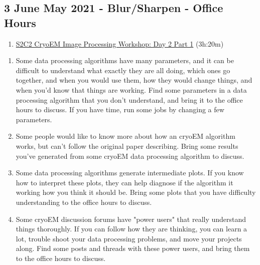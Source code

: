 \documentclass[11pt, oneside]{article}   	%
\begin{document}
\subsection{3 June May 2021 - Blur/Sharpen - Office Hours}
\begin{enumerate}
	\item \href{https://youtu.be/ehXqLnV_Jr4}{S2C2 CryoEM Image Processing Workshop: Day 2 Part 1} (3h:20m)
	\end{enumerate}
\begin{enumerate}
	\item Some data processing algorithms have many parameters, and it can be difficult to understand what exactly they are all doing, which ones go together, and when you would use them, how they would change things, and when you'd know that things are working. Find some parameters in a data processing algorithm that you don't understand, and bring it to the office hours to discuss. If you have time, run some jobs by changing a few parameters.
	\item Some people would like to know more about how an cryoEM algorithm works, but can't follow the original paper describing. Bring some results you've generated from some cryoEM data processing algorithm to discuss.
	\item Some data processing algorithms generate intermediate plots. If you know how to interpret these plots, they can help diagnose if the algorithm it working how you think it should be. Bring some plots that you have difficulty understanding to the office hours to discuss.  
	\item Some cryoEM discussion forums have "power users" that really understand things thoroughly. If you can follow how they are thinking, you can learn a lot, trouble shoot your data processing problems, and move your projects along. Find some posts and threads with these power users, and bring them to the office hours to discuss.
\end{enumerate}
\end{document}
